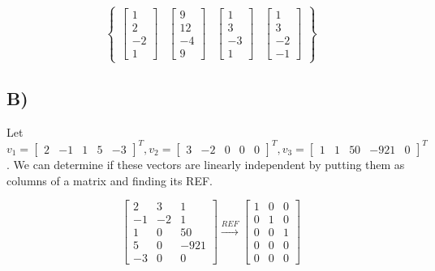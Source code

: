 \documentclass[12pt, letterpaper]{article}
\begin{document}
\[ \begin{Bmatrix} \begin{bmatrix} 1 \\ 2 \\ -2 \\ 1 \end{bmatrix} & \begin{bmatrix} 9 \\ 12 \\ -4 \\ 9 \end{bmatrix} & \begin{bmatrix} 1 \\ 3 \\ -3 \\ 1 \end{bmatrix} & \begin{bmatrix} 1 \\ 3 \\ -2 \\ -1 \end{bmatrix} \end{Bmatrix} \]

\subsection*{B)}
Let $v_1 = \begin{bmatrix} 2 & -1 & 1 & 5 & -3 \end{bmatrix}^T, v_2 = \begin{bmatrix} 3 & -2 & 0 & 0 & 0 \end{bmatrix}^T, v_3 = \begin{bmatrix} 1 & 1 & 50 & -921 & 0 \end{bmatrix}^T$. We can determine if these vectors are linearly independent by putting them as columns of a matrix and finding its REF.

\[ \begin{bmatrix} 2 & 3 & 1 \\ -1 & -2 & 1 \\ 1 & 0 & 50 \\ 5 & 0 & -921 \\ -3 & 0 & 0 \end{bmatrix} \xrightarrow{REF} \begin{bmatrix} 1 & 0 & 0 \\ 0 & 1 & 0 \\ 0 & 0 & 1 \\ 0 & 0 & 0 \\ 0 & 0 & 0 \end{bmatrix}  \]
\end{document}
